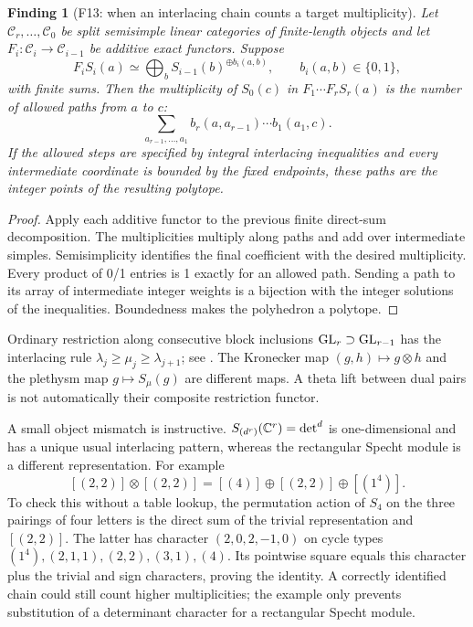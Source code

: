 \documentclass[11pt,a4paper]{article}
\newcommand{\fid}[1]{\textsf{#1}}\newcommand{\gate}[1]{\textsf{#1}}
\theoremstyle{named}\newtheorem{finding}{Finding}[section]
\theoremstyle{definition}\newtheorem{definition}[finding]{Definition}
\theoremstyle{remark}\newtheorem{remark}[finding]{Remark}
\begin{document}
\begin{finding}[\fid{F13}: when an interlacing chain counts a target multiplicity]\label{f:branching}
Let $\mathscr C_r,\ldots,\mathscr C_0$ be split semisimple linear categories of finite-length objects and let $F_i:\mathscr C_i\to\mathscr C_{i-1}$ be additive exact functors. Suppose
\[
 F_i S_i(a)\simeq\bigoplus_b S_{i-1}(b)^{\oplus b_i(a,b)},\qquad b_i(a,b)\in\{0,1\},
\]
with finite sums. Then the multiplicity of $S_0(c)$ in $F_1\cdots F_rS_r(a)$ is the number of allowed paths from $a$ to $c$:
\[
 \sum_{a_{r-1},\ldots,a_1}
 b_r(a,a_{r-1})\cdots b_1(a_1,c).
\]
If the allowed steps are specified by integral interlacing inequalities and every intermediate coordinate is bounded by the fixed endpoints, these paths are the integer points of the resulting polytope.
\end{finding}
\begin{proof}
Apply each additive functor to the previous finite direct-sum decomposition. The multiplicities multiply along paths and add over intermediate simples. Semisimplicity identifies the final coefficient with the desired multiplicity. Every product of 0/1 entries is 1 exactly for an allowed path. Sending a path to its array of intermediate integer weights is a bijection with the integer solutions of the inequalities. Boundedness makes the polyhedron a polytope.
\end{proof}
Ordinary restriction along consecutive block inclusions $\mathrm{GL}_r\supset\mathrm{GL}_{r-1}$ has the interlacing rule $\lambda_j\ge\mu_j\ge\lambda_{j+1}$; see \cite[Theorem 2.1, equation (2.2), and the patterns (2.4)]{Molev}. The Kronecker map $(g,h)\mapsto g\otimes h$ and the plethysm map $g\mapsto S_\mu(g)$ are different maps. A theta lift between dual pairs is not automatically their composite restriction functor.

A small object mismatch is instructive. $S_{(d^r)}(\mathbb C^r)=\det^d$ is one-dimensional and has a unique usual interlacing pattern, whereas the rectangular Specht module is a different representation. For example
\[
 [(2,2)]\otimes[(2,2)]=[(4)]\oplus[(2,2)]\oplus[(1^4)].
\]
To check this without a table lookup, the permutation action of $S_4$ on the three pairings of four letters is the direct sum of the trivial representation and $[(2,2)]$. The latter has character $(2,0,2,-1,0)$ on cycle types $(1^4),(2,1,1),(2,2),(3,1),(4)$. Its pointwise square equals this character plus the trivial and sign characters, proving the identity. A correctly identified chain could still count higher multiplicities; the example only prevents substitution of a determinant character for a rectangular Specht module.
\end{document}
